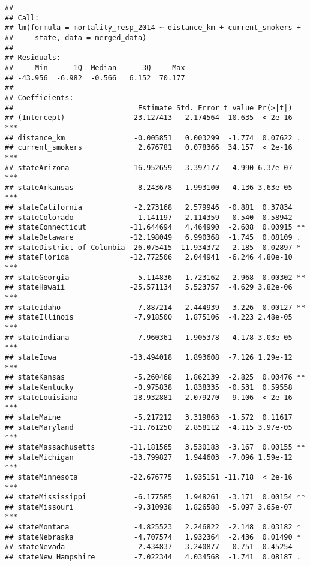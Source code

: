 \documentclass[
]{article}
\begin{document}
\begin{verbatim}
## 
## Call:
## lm(formula = mortality_resp_2014 ~ distance_km + current_smokers + 
##     state, data = merged_data)
## 
## Residuals:
##     Min      1Q  Median      3Q     Max 
## -43.956  -6.982  -0.566   6.152  70.177 
## 
## Coefficients:
##                             Estimate Std. Error t value Pr(>|t|)    
## (Intercept)                23.127413   2.174564  10.635  < 2e-16 ***
## distance_km                -0.005851   0.003299  -1.774  0.07622 .  
## current_smokers             2.676781   0.078366  34.157  < 2e-16 ***
## stateArizona              -16.952659   3.397177  -4.990 6.37e-07 ***
## stateArkansas              -8.243678   1.993100  -4.136 3.63e-05 ***
## stateCalifornia            -2.273168   2.579946  -0.881  0.37834    
## stateColorado              -1.141197   2.114359  -0.540  0.58942    
## stateConnecticut          -11.644694   4.464990  -2.608  0.00915 ** 
## stateDelaware             -12.198049   6.990368  -1.745  0.08109 .  
## stateDistrict of Columbia -26.075415  11.934372  -2.185  0.02897 *  
## stateFlorida              -12.772506   2.044941  -6.246 4.80e-10 ***
## stateGeorgia               -5.114836   1.723162  -2.968  0.00302 ** 
## stateHawaii               -25.571134   5.523757  -4.629 3.82e-06 ***
## stateIdaho                 -7.887214   2.444939  -3.226  0.00127 ** 
## stateIllinois              -7.918500   1.875106  -4.223 2.48e-05 ***
## stateIndiana               -7.960361   1.905378  -4.178 3.03e-05 ***
## stateIowa                 -13.494018   1.893608  -7.126 1.29e-12 ***
## stateKansas                -5.260468   1.862139  -2.825  0.00476 ** 
## stateKentucky              -0.975838   1.838335  -0.531  0.59558    
## stateLouisiana            -18.932881   2.079270  -9.106  < 2e-16 ***
## stateMaine                 -5.217212   3.319863  -1.572  0.11617    
## stateMaryland             -11.761250   2.858112  -4.115 3.97e-05 ***
## stateMassachusetts        -11.181565   3.530183  -3.167  0.00155 ** 
## stateMichigan             -13.799827   1.944603  -7.096 1.59e-12 ***
## stateMinnesota            -22.676775   1.935151 -11.718  < 2e-16 ***
## stateMississippi           -6.177585   1.948261  -3.171  0.00154 ** 
## stateMissouri              -9.310938   1.826588  -5.097 3.65e-07 ***
## stateMontana               -4.825523   2.246822  -2.148  0.03182 *  
## stateNebraska              -4.707574   1.932364  -2.436  0.01490 *  
## stateNevada                -2.434837   3.240877  -0.751  0.45254    
## stateNew Hampshire         -7.022344   4.034568  -1.741  0.08187 .  

\end{verbatim}
\end{document}

